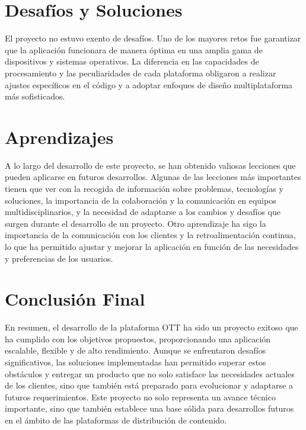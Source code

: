 \section{Desafíos y Soluciones}
\label{sec:conclusiones:desafios}

El proyecto no estuvo exento de desafíos. Uno de los mayores retos fue garantizar que la aplicación funcionara de manera 
óptima en una amplia gama de dispositivos y sistemas operativos. La diferencia en las capacidades de procesamiento y las 
peculiaridades de cada plataforma obligaron a realizar ajustes específicos en el código y a adoptar enfoques de diseño 
multiplataforma más sofisticados.

\section{Aprendizajes}
\label{sec:conclusiones:mejoras}

A lo largo del desarrollo de este proyecto, se han obtenido valiosas lecciones que pueden aplicarse en futuros desarrollos. 
Algunas de las lecciones más importantes tienen que ver con la recogida de información sobre problemas, tecnologías y
soluciones, la importancia de la colaboración y la comunicación en equipos multidisciplinarios, y la necesidad de adaptarse
a los cambios y desafíos que surgen durante el desarrollo de un proyecto. Otro aprendizaje ha sigo la importancia de la
comunicación con los clientes y la retroalimentación continua, lo que ha permitido ajustar y mejorar la aplicación en función
de las necesidades y preferencias de los usuarios.


\section{Conclusión Final}
\label{sec:conclusiones:final}

En resumen, el desarrollo de la plataforma OTT ha sido un proyecto exitoso que ha cumplido con los objetivos propuestos, 
proporcionando una aplicación escalable, flexible y de alto rendimiento. Aunque se enfrentaron desafíos significativos, 
las soluciones implementadas han permitido superar estos obstáculos y entregar un producto que no solo satisface las 
necesidades actuales de los clientes, sino que también está preparado para evolucionar y adaptarse a futuros requerimientos. 
Este proyecto no solo representa un avance técnico importante, sino que también establece una base sólida para desarrollos 
futuros en el ámbito de las plataformas de distribución de contenido.
